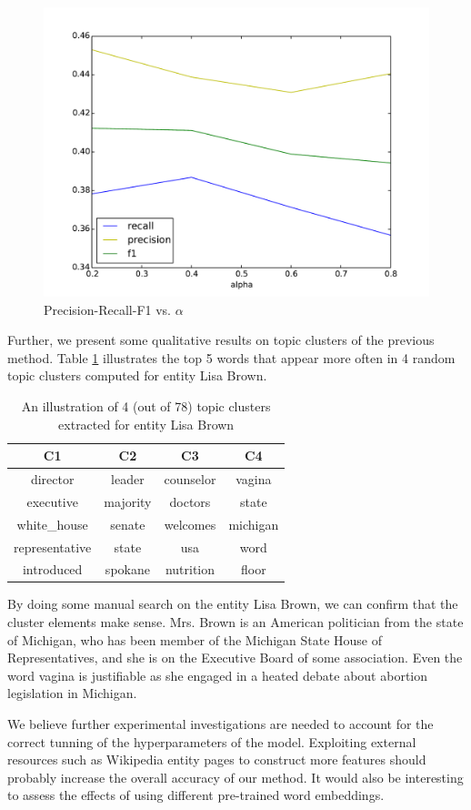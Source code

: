 \documentclass{article}
\begin{document}
{{\begin{figure}[h!]
\centering
\includegraphics[width=.5\textwidth]{fig/alphaPlotMacro.pdf}
\caption{Precision-Recall-F1 vs. $\alpha$}
\label{varyingalpha}
\end{figure}


Further, we present some qualitative results on topic clusters of the previous method. Table \ref{clusterresult} illustrates the top 5 words that appear more often in 4 random topic clusters computed for entity Lisa Brown.

\begin{table}[H]
\center
\begin{tabular}{|c|c|c|c|} \hline
\textbf{C1} & \textbf{C2} & \textbf{C3} & \textbf{C4} \\ \hline\hline
director & leader & counselor & vagina \\ \hline
executive & majority & doctors & state \\ \hline
white\_house & senate & welcomes & michigan \\ \hline
representative & state & usa & word \\ \hline
introduced & spokane & nutrition & floor \\ \hline
\end{tabular}
\caption{An illustration of 4 (out of 78) topic clusters extracted for entity Lisa Brown}
\label{clusterresult}
\end{table}

By doing some manual search on the entity Lisa Brown, we can confirm that the cluster elements make sense. Mrs. Brown is an American politician from the state of Michigan, who has been member of the Michigan State House of Representatives, and she is on the Executive Board of some association.
Even the word vagina is justifiable as she engaged in a heated debate about abortion legislation in Michigan.

We believe further experimental investigations are needed to account for the correct tunning of the hyperparameters of the model. Exploiting external resources such as Wikipedia entity pages to construct more features \cite{xitong12} should probably increase the overall accuracy of our method. It would also be interesting to assess the effects of using different pre-trained word embeddings.

}}
\end{document}
